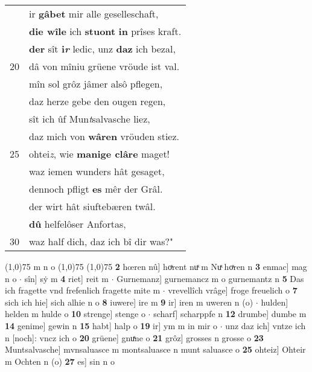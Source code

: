 \documentclass[8pt,a4paper,notitlepage]{article}
\begin{document}
\begin{table}[ht]
\begin{minipage}[t]{0.5\linewidth}
\begin{tabular}{rl}
 & ir \textbf{gâbet} mir alle geselleschaft,\\ 
 & \textbf{die wîle} ich \textbf{stuont} \textbf{in} prîses kraft.\\ 
 & \textbf{der} sît \textbf{i\textit{r}} ledic, unz \textbf{daz} ich bezal,\\ 
20 & dâ von mîniu grüene vröude ist val.\\ 
 & mîn sol grôz jâmer alsô pflegen,\\ 
 & daz herze gebe den ougen regen,\\ 
 & sît ich ûf Mun\textit{t}salvasche liez,\\ 
 & daz mich von \textbf{wâren} vröuden stiez.\\ 
25 & ohtei\textit{z}, wie \textbf{manige clâre} maget!\\ 
 & waz iemen wunders hât gesaget,\\ 
 & dennoch pfligt \textbf{es} mêr der Grâl.\\ 
 & der wirt hât siuftebæren twâl.\\ 
 & \textbf{dû} helfelôser Anfortas,\\ 
30 & waz half dich, daz ich bî dir was?"\\ 
\end{tabular}
\scriptsize
\line(1,0){75} \newline
m n o \newline
\line(1,0){75} \newline
\newline
\line(1,0){75} \newline
\textbf{2} hœren nû] hoͯrent nuͯ m Nuͯ hoͯren n \textbf{3} enmac] mag n o  $\cdot$ sîn] sẏ m \textbf{4} riet] reit m  $\cdot$ Gurnemanz] gurnemancz m o gurnemantz n \textbf{5} Das ich fragette vnd frefenlich fragette mite m  $\cdot$ vrevellîch vrâge] froge freuelich o \textbf{7} sich ich hie] sich alhie n o \textbf{8} iuwere] ire m \textbf{9} ir] iren m uweren n (o)  $\cdot$ hulden] helden m hulde o \textbf{10} strenge] stenge o  $\cdot$ scharf] scharppfe n \textbf{12} drumbe] dumbe m \textbf{14} genime] gewin n \textbf{15} habt] halp o \textbf{19} ir] ym m in mir o  $\cdot$ unz daz ich] vntze ich n [noch]: vncz ich o \textbf{20} grüene] gnuͯne o \textbf{21} grôz] grosses n grosse o \textbf{23} Muntsalvasche] mvnsaluasce m montsaluasce n munt saluasce o \textbf{25} ohteiz] Ohteir m Ochten n (o) \textbf{27} es] sin n o \newline
\end{minipage}
\end{table}
\newpage
\end{document}
